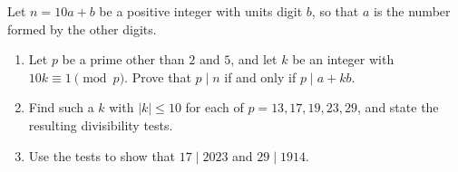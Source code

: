 Let $n=10a+b$ be a positive integer with units digit $b$, so that $a$ is the number formed by the other digits.
\begin{enumerate}
\item[(a)] Let $p$ be a prime other than $2$ and $5$, and let $k$ be an integer with $10k\equiv1\pmod p$. Prove that $p\mid n$ if and only if $p\mid a+kb$.
\item[(b)] Find such a $k$ with $|k|\le10$ for each of $p=13,17,19,23,29$, and state the resulting divisibility tests.
\item[(c)] Use the tests to show that $17\mid2023$ and $29\mid1914$.
\end{enumerate}
